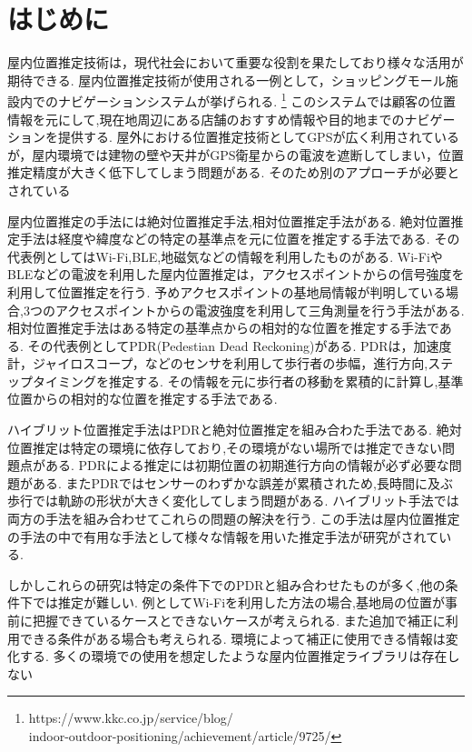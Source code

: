 
\section{はじめに}
屋内位置推定技術は，現代社会において重要な役割を果たしており様々な活用が期待できる.
屋内位置推定技術が使用される一例として，ショッピングモール施設内でのナビゲーションシステムが挙げられる.
\footnote{https://www.kkc.co.jp/service/blog/\\indoor-outdoor-positioning/achievement/article/9725/}
このシステムでは顧客の位置情報を元にして,現在地周辺にある店舗のおすすめ情報や目的地までのナビゲーションを提供する.
屋外における位置推定技術としてGPSが広く利用されているが，屋内環境では建物の壁や天井がGPS衛星からの電波を遮断してしまい，位置推定精度が大きく低下してしまう問題がある.
そのため別のアプローチが必要とされている

屋内位置推定の手法には絶対位置推定手法,相対位置推定手法がある.
絶対位置推定手法は経度や緯度などの特定の基準点を元に位置を推定する手法である.
その代表例としてはWi-Fi,BLE,地磁気などの情報を利用したものがある.
Wi-FiやBLEなどの電波を利用した屋内位置推定は，アクセスポイントからの信号強度を利用して位置推定を行う.
予めアクセスポイントの基地局情報が判明している場合,3つのアクセスポイントからの電波強度を利用して三角測量を行う手法がある.
相対位置推定手法はある特定の基準点からの相対的な位置を推定する手法である.
その代表例としてPDR(Pedestian Dead Reckoning)がある.
PDRは，加速度計，ジャイロスコープ，などのセンサを利用して歩行者の歩幅，進行方向,ステップタイミングを推定する.
その情報を元に歩行者の移動を累積的に計算し,基準位置からの相対的な位置を推定する手法である.

ハイブリット位置推定手法はPDRと絶対位置推定を組み合わた手法である.
絶対位置推定は特定の環境に依存しており,その環境がない場所では推定できない問題点がある.
PDRによる推定には初期位置の初期進行方向の情報が必ず必要な問題がある.
またPDRではセンサーのわずかな誤差が累積されため,長時間に及ぶ歩行では軌跡の形状が大きく変化してしまう問題がある.
ハイブリット手法では両方の手法を組み合わせてこれらの問題の解決を行う.
この手法は屋内位置推定の手法の中で有用な手法として様々な情報を用いた推定手法が研究がされている.

しかしこれらの研究は特定の条件下でのPDRと組み合わせたものが多く,他の条件下では推定が難しい.
例としてWi-Fiを利用した方法の場合,基地局の位置が事前に把握できているケースとできないケースが考えられる.
また追加で補正に利用できる条件がある場合も考えられる.
環境によって補正に使用できる情報は変化する.
多くの環境での使用を想定したような屋内位置推定ライブラリは存在しない

